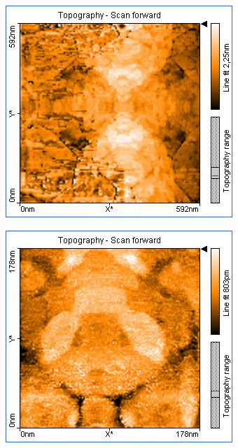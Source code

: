 \begin{figure}
    \begin{subfigure}[b]{\picwidth}
        \includegraphics[width=\textwidth]{data/Gold/pic_02_01_600nm}
        \caption{}
        \label{fig:gold_02_01}
    \end{subfigure}\qquad
    \begin{subfigure}[b]{\picwidth}
        \includegraphics[width=\textwidth]{data/Gold/pic_02_02_180nm}

\end{subfigure}
\end{figure}
